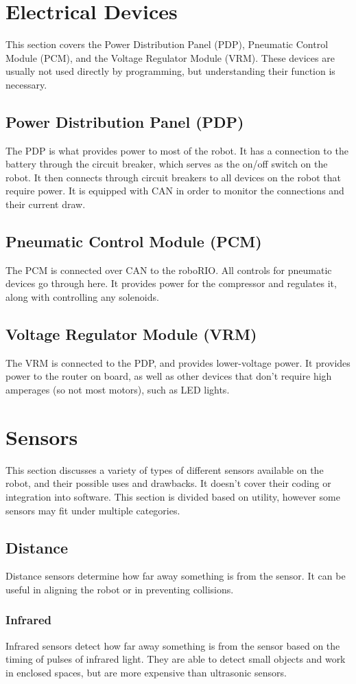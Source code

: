 \documentclass[]{report}
\begin{document}
\section{Electrical Devices}
	This section covers the Power Distribution Panel (PDP), Pneumatic Control Module (PCM), and the Voltage Regulator Module (VRM).
	These devices are usually not used directly by programming, but understanding their function is necessary.
\subsection{Power Distribution Panel (PDP)}
	The PDP is what provides power to most of the robot.
	It has a connection to the battery through the circuit breaker, which serves as the on/off switch on the robot.
	It then connects through circuit breakers to all devices on the robot that require power.
	It is equipped with CAN in order to monitor the connections and their current draw.
\subsection{Pneumatic Control Module (PCM)}
	The PCM is connected over CAN to the roboRIO.
	All controls for pneumatic devices go through here.
	It provides power for the compressor and regulates it, along with controlling any solenoids.
\subsection{Voltage Regulator Module (VRM)}
	The VRM is connected to the PDP, and provides lower-voltage power.
	It provides power to the router on board, as well as other devices that don't require high amperages (so not most motors), such as LED lights.
\section{Sensors}
	This section discusses a variety of types of different sensors available on the robot, and their possible uses and drawbacks.
	It doesn't cover their coding or integration into software.
	This section is divided based on utility, however some sensors may fit under multiple categories.
\subsection{Distance}
	Distance sensors determine how far away something is from the sensor.
	It can be useful in aligning the robot or in preventing collisions.
	\subsubsection{Infrared}
		Infrared sensors detect how far away something is from the sensor based on the timing of pulses of infrared light.
		They are able to detect small objects and work in enclosed spaces, but are more expensive than ultrasonic sensors.
\end{document}
